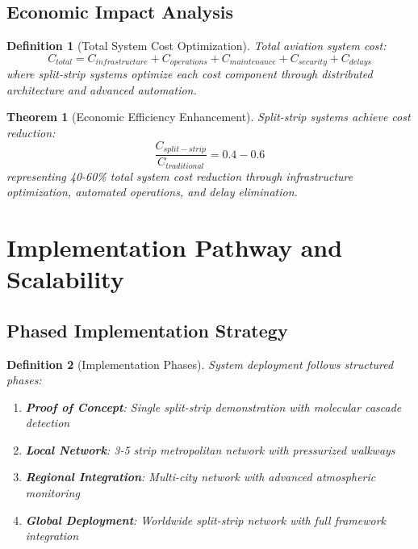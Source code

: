 \documentclass[12pt,a4paper]{article}
\newtheorem{theorem}{Theorem}
\newtheorem{definition}{Definition}
\begin{document}
\subsection{Economic Impact Analysis}

\begin{definition}[Total System Cost Optimization]
Total aviation system cost:
\begin{equation}
C_{total} = C_{infrastructure} + C_{operations} + C_{maintenance} + C_{security} + C_{delays}
\end{equation}
where split-strip systems optimize each cost component through distributed architecture and advanced automation.
\end{definition}

\begin{theorem}[Economic Efficiency Enhancement]
Split-strip systems achieve cost reduction:
\begin{equation}
\frac{C_{split-strip}}{C_{traditional}} = 0.4 - 0.6
\end{equation}
representing 40-60\% total system cost reduction through infrastructure optimization, automated operations, and delay elimination.
\end{theorem}

\section{Implementation Pathway and Scalability}

\subsection{Phased Implementation Strategy}

\begin{definition}[Implementation Phases]
System deployment follows structured phases:
\begin{enumerate}
\item \textbf{Proof of Concept}: Single split-strip demonstration with molecular cascade detection
\item \textbf{Local Network}: 3-5 strip metropolitan network with pressurized walkways
\item \textbf{Regional Integration}: Multi-city network with advanced atmospheric monitoring
\item \textbf{Global Deployment}: Worldwide split-strip network with full framework integration
\end{enumerate}
\end{definition}
\end{document}
